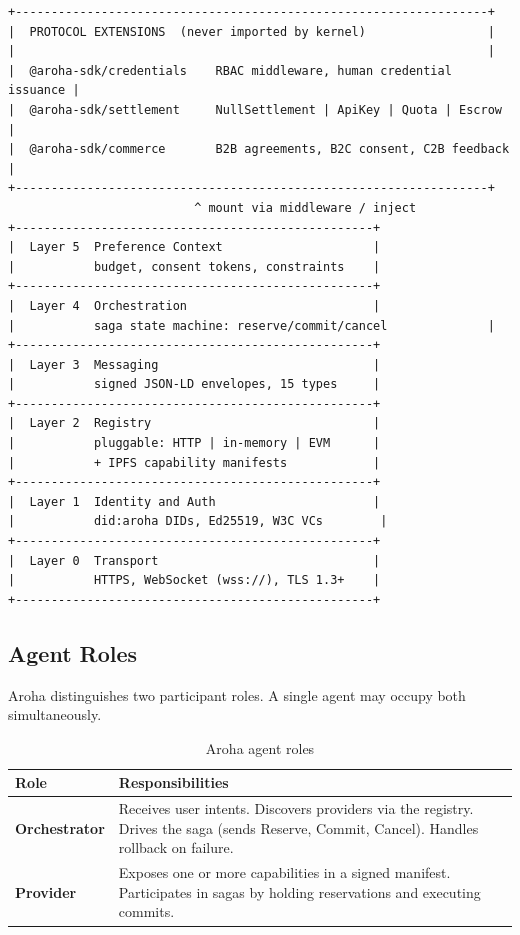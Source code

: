 \documentclass[11pt,a4paper]{article}
\begin{document}
\begin{verbatim}
+------------------------------------------------------------------+
|  PROTOCOL EXTENSIONS  (never imported by kernel)                 |
|                                                                  |
|  @aroha-sdk/credentials    RBAC middleware, human credential issuance |
|  @aroha-sdk/settlement     NullSettlement | ApiKey | Quota | Escrow   |
|  @aroha-sdk/commerce       B2B agreements, B2C consent, C2B feedback  |
+------------------------------------------------------------------+
                          ^ mount via middleware / inject
+--------------------------------------------------+
|  Layer 5  Preference Context                     |
|           budget, consent tokens, constraints    |
+--------------------------------------------------+
|  Layer 4  Orchestration                          |
|           saga state machine: reserve/commit/cancel              |
+--------------------------------------------------+
|  Layer 3  Messaging                              |
|           signed JSON-LD envelopes, 15 types     |
+--------------------------------------------------+
|  Layer 2  Registry                               |
|           pluggable: HTTP | in-memory | EVM      |
|           + IPFS capability manifests            |
+--------------------------------------------------+
|  Layer 1  Identity and Auth                      |
|           did:aroha DIDs, Ed25519, W3C VCs        |
+--------------------------------------------------+
|  Layer 0  Transport                              |
|           HTTPS, WebSocket (wss://), TLS 1.3+    |
+--------------------------------------------------+
\end{verbatim}

\subsection{Agent Roles}

Aroha distinguishes two participant roles. A single agent may occupy both
simultaneously.

\begin{table}[ht]
  \centering
  \renewcommand{\arraystretch}{1.4}
  \begin{tabularx}{\textwidth}{@{} l X @{}}
    \toprule
    \textbf{Role} & \textbf{Responsibilities} \\
    \midrule
    \textbf{Orchestrator}
      & Receives user intents. Discovers providers via the registry. Drives the
        saga (sends Reserve, Commit, Cancel). Handles rollback on failure. \\
    \textbf{Provider}
      & Exposes one or more capabilities in a signed manifest. Participates in
        sagas by holding reservations and executing commits. \\
    \bottomrule
  \end{tabularx}
  \caption{Aroha agent roles}
\end{table}
\end{document}
